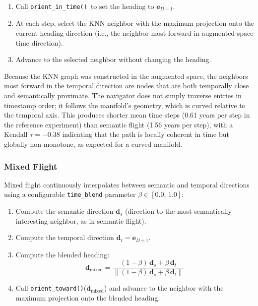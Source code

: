 \documentclass[12pt,letterpaper]{article}
\newcommand{\orientintime}{\texttt{orient\_in\_time()}}
\newcommand{\orienttoward}{\texttt{orient\_toward()}}
\begin{document}
\begin{enumerate}[noitemsep]
  \item Call \orientintime\ to set the heading to $\mathbf{e}_{D+1}$.
  \item At each step, select the KNN neighbor with the maximum projection onto
    the current heading direction (i.e., the neighbor most forward in
    augmented-space time direction).
  \item Advance to the selected neighbor without changing the heading.
\end{enumerate}

Because the KNN graph was constructed in the augmented space, the neighbors
most forward in the temporal direction are nodes that are both temporally
close and semantically proximate. The navigator does not simply traverse
entries in timestamp order; it follows the manifold's geometry, which is
curved relative to the temporal axis. This produces shorter mean time steps
(0.61 years per step in the reference experiment) than semantic flight
(1.56 years per step), with a Kendall $\tau = -0.38$ indicating that the path
is locally coherent in time but globally non-monotone, as expected for a
curved manifold.

\subsubsection{Mixed Flight}

Mixed flight continuously interpolates between semantic and temporal directions
using a configurable \texttt{time\_blend} parameter $\beta \in [0.0,\, 1.0]$:

\begin{enumerate}[noitemsep]
  \item Compute the semantic direction $\mathbf{d}_s$ (direction to the most
    semantically interesting neighbor, as in semantic flight).
  \item Compute the temporal direction $\mathbf{d}_t = \mathbf{e}_{D+1}$.
  \item Compute the blended heading:
    \begin{equation}
      \mathbf{d}_{\text{mixed}} = \frac{(1-\beta)\,\mathbf{d}_s + \beta\,\mathbf{d}_t}
                                       {\|(1-\beta)\,\mathbf{d}_s + \beta\,\mathbf{d}_t\|}
      \label{eq:blend}
    \end{equation}
  \item Call \orienttoward($\mathbf{d}_{\text{mixed}}$) and advance to the
    neighbor with the maximum projection onto the blended heading.
\end{enumerate}
\end{document}

